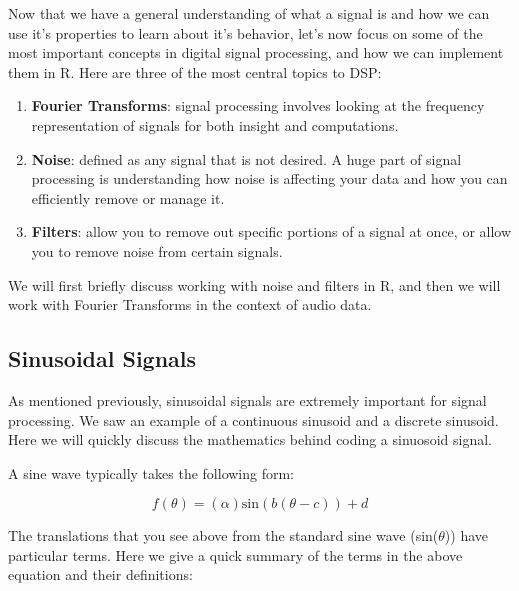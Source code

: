 \documentclass[
]{krantz}
\providecommand{\tightlist}{%
  \setlength{\itemsep}{0pt}\setlength{\parskip}{0pt}}
\begin{document}
Now that we have a general understanding of what a signal is and how we can use it's properties to learn about it's behavior, let's now focus on some of the most important concepts in digital signal processing, and how we can implement them in R. Here are three of the most central topics to DSP:

\begin{enumerate}
\def\labelenumi{\arabic{enumi}.}
\tightlist
\item
  \textbf{Fourier Transforms}: signal processing involves looking at the frequency representation of signals for both insight and computations.
\item
  \textbf{Noise}: defined as any signal that is not desired. A huge part of signal processing is understanding how noise is affecting your data and how you can efficiently remove or manage it.
\item
  \textbf{Filters}: allow you to remove out specific portions of a signal at once, or allow you to remove noise from certain signals.
\end{enumerate}

We will first briefly discuss working with noise and filters in R, and then we will work with Fourier Transforms in the context of audio data.

\hypertarget{sinusoidal-signals}{%
\subsection{Sinusoidal Signals}\label{sinusoidal-signals}}

As mentioned previously, sinusoidal signals are extremely important for signal processing. We saw an example of a continuous sinusoid and a discrete sinusoid. Here we will quickly discuss the mathematics behind coding a sinuosoid signal.

A sine wave typically takes the following form:

\[
f(\theta) = (\alpha) \text{sin}(b(\theta - c)) + d
\]

The translations that you see above from the standard sine wave (sin(\(\theta\))) have particular terms. Here we give a quick summary of the terms in the above equation and their definitions:
\end{document}
